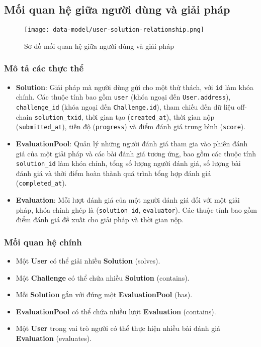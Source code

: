 \subsection{Mối quan hệ giữa người dùng và giải pháp}

\begin{figure}[H]
  \centering
  \texttt{[image: data-model/user-solution-relationship.png]}
  \caption{Sơ đồ mối quan hệ giữa người dùng và giải pháp}
  \label{fig:user-solution-relationship}
\end{figure}

\subsubsection{Mô tả các thực thể}

\begin{itemize}
  \item \textbf{Solution}: Giải pháp mà người dùng gửi cho một thử thách, với \texttt{id} làm khóa chính. Các thuộc tính bao gồm \texttt{user} (khóa ngoại đến \texttt{User.address}), \texttt{challenge\_id} (khóa ngoại đến \texttt{Challenge.id}), tham chiếu đến dữ liệu off-chain \texttt{solution\_txid}, thời gian tạo (\texttt{created\_at}), thời gian nộp (\texttt{submitted\_at}), tiến độ (\texttt{progress}) và điểm đánh giá trung bình (\texttt{score}).
  \item \textbf{EvaluationPool}: Quản lý những người đánh giá tham gia vào phiên đánh giá của một giải pháp và các bài đánh giá tương ứng, bao gồm các thuộc tính \texttt{solution\_id} làm khóa chính, tổng số lượng người đánh giá, số lượng bài đánh giá và thời điểm hoàn thành quá trình tổng hợp đánh giá (\texttt{completed\_at}).
  \item \textbf{Evaluation}: Mỗi lượt đánh giá của một người đánh giá đối với một giải pháp, khóa chính ghép là (\texttt{solution\_id}, \texttt{evaluator}). Các thuộc tính bao gồm điểm đánh giá đề xuất cho giải pháp và thời gian nộp.
\end{itemize}

\subsubsection{Mối quan hệ chính}
\begin{itemize}
  \item Một \textbf{User} có thể giải nhiều \textbf{Solution} (solves).
  \item Một \textbf{Challenge} có thể chứa nhiều \textbf{Solution} (contains).
  \item Mỗi \textbf{Solution} gắn với đúng một \textbf{EvaluationPool} (has).
  \item \textbf{EvaluationPool} có thể chứa nhiều lượt \textbf{Evaluation} (contains).
  \item Một \textbf{User} trong vai trò người  có thể thực hiện nhiều bài đánh giá \textbf{Evaluation} (evaluates).
\end{itemize}


